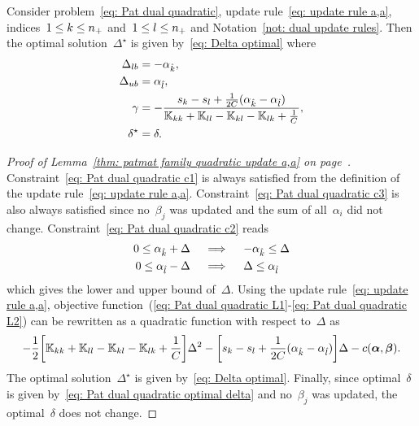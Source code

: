\begin{lemma}\label{thm: patmat family quadratic update a,a}
  Consider problem~\eqref{eq: Pat dual quadratic}, update rule~\eqref{eq: update rule a,a}, indices~$1 \leq k \leq n_{+}$ and~$1 \leq l \leq n_{+}$  and Notation~\ref{not: dual update rules}. Then the optimal solution~$\Delta^{\star}$ is given by~\eqref{eq: Delta optimal} where
  \begin{align*}
    \Delta_{lb} & = -\alpha_{\hat{k}}, \\
    \Delta_{ub} & = \alpha_{\hat{l}}, \\
    \gamma & = -\frac{s_k - s_l + \frac{1}{2C}(\alpha_{\hat{k}} - \alpha_{\hat{l}})}{\mathbb{K}_{kk} + \mathbb{K}_{ll} - \mathbb{K}_{kl} - \mathbb{K}_{lk} + \frac{1}{C}}, \\
    \delta^{\star}  & = \delta.
  \end{align*}
\end{lemma}

\begin{proof}[Proof of Lemma~\ref{thm: patmat family quadratic update a,a} on page~\pageref{thm: patmat family quadratic update a,a}]
  Constraint~\eqref{eq: Pat dual quadratic c1} is always satisfied from the definition of the update rule~\eqref{eq: update rule a,a}. Constraint~\eqref{eq: Pat dual quadratic c3} is also always satisfied since no~$\beta_j$ was updated and the sum of all~$\alpha_i$ did not change. Constraint~\eqref{eq: Pat dual quadratic c2} reads
  \begin{align*}
    0 \leq \alpha_{\hat{k}} + \Delta
    & \quad \implies \quad
    - \alpha_{\hat{k}} \leq \Delta \\
    0 \leq \alpha_{\hat{l}} - \Delta
    & \quad \implies \quad
    \Delta \leq \alpha_{\hat{l}}
  \end{align*}
  which gives the lower and upper bound of~$\Delta.$ Using the update rule~\eqref{eq: update rule a,a}, objective function~(\ref{eq: Pat dual quadratic L1}-\ref{eq: Pat dual quadratic L2}) can be rewritten as a quadratic function with respect to~$\Delta$ as
  \begin{equation*}
    - \frac{1}{2} \Brac[s]{\K_{kk} + \K_{ll} - \K_{kl} - \K_{lk} + \frac{1}{C}} \Delta^2
    - \Brac[s]{s_k - s_l + \frac{1}{2C}(\alphak - \alphal)} \Delta
    - c(\bm{\alpha}, \bm{\beta}).
  \end{equation*}
  The optimal solution~$\Delta^{\star}$ is given by~\eqref{eq: Delta optimal}. Finally, since optimal~$\delta$ is given by~\eqref{eq: Pat dual quadratic optimal delta} and no~$\beta_j$ was updated, the optimal~$\delta$ does not change.
\end{proof}

